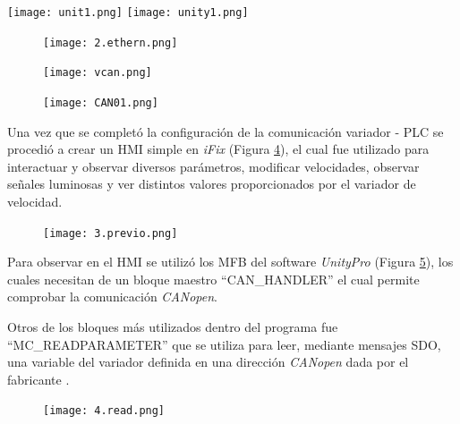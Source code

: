 \begin{center}
	\texttt{[image: unit1.png]}
	\label{fig:uni1}
	\texttt{[image: unity1.png]}
	\label{fig:uni0}
\end{center}



\begin{figure}[h!]
	\centering
	\texttt{[image: 2.ethern.png]}
	\label{fig:inter}
\end{figure}

\begin{figure}[h!]
	\centering
	\texttt{[image: vcan.png]}
	\label{fig:vcan}
\end{figure}

\begin{figure}[h!]
	\centering
	\texttt{[image: CAN01.png]}
	\label{fig:CAN01}
\end{figure}

Una vez que se completó la configuración de la comunicación variador - PLC se procedió a crear un HMI simple en\textit{ iFix} (Figura \ref{fig:previo}), el cual fue utilizado para interactuar y observar diversos parámetros, modificar velocidades, observar señales luminosas y ver distintos valores proporcionados por el variador de velocidad.
 
\begin{figure}[h!]
	\centering
	\texttt{[image: 3.previo.png]}
	\label{fig:previo}
\end{figure}

Para observar en el HMI se utilizó los MFB del software \textit{UnityPro} (Figura \ref{fig:read}), los cuales necesitan de un bloque maestro ``CAN\_HANDLER'' el cual permite comprobar la comunicación \textit{CANopen}.

Otros de los bloques más utilizados dentro del programa fue ``MC\_READPARAMETER'' que se utiliza para leer, mediante mensajes SDO, una variable del variador definida en una dirección \textit{CANopen} dada por el fabricante \cite{ComManual}.

\begin{figure}[h!]
	\centering
	\texttt{[image: 4.read.png]}
	\label{fig:read}
\end{figure}



